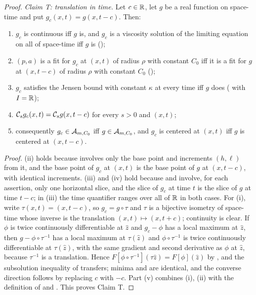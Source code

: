 \begin{proof}
\emph{Claim T: translation in time.}
Let $c\in\mathbb{R}$, let $g$ be a real function on space-time and put
$g_c(x,t)=g(x,t-c)$. Then:
\begin{enumerate}
\item[(i)] $g_c$ is continuous iff $g$ is, and $g_c$ is a viscosity solution of
the limiting equation on all of space-time iff $g$ is
();
\item[(ii)] $(p,a)$ is a fit for $g_c$ at $(x,t)$ of radius $\rho$ with constant
$C_0$ iff it is a fit for $g$ at $(x,t-c)$ of radius $\rho$ with constant $C_0$
();
\item[(iii)] $g_c$ satisfies the Jensen bound with constant $\kappa$ at every
time iff $g$ does ( with $I=\mathbb{R}$);
\item[(iv)] $\mathcal{C}_sg_c(x,t)=\mathcal{C}_sg(x,t-c)$ for every $s>0$ and $(x,t)$;
\item[(v)] consequently $g_c\in\mathcal{A}_{m,C_0}$ iff $g\in\mathcal{A}_{m,C_0}$, and
$g_c$ is centered at $(x,t)$ iff $g$ is centered at $(x,t-c)$.
\end{enumerate}
\emph{Proof.} (ii) holds because  involves only the base point
and increments $(h,\ell)$ from it, and the base point of $g_c$ at $(x,t)$ is the
base point of $g$ at $(x,t-c)$, with identical increments. (iii) and (iv) hold
because  and  involve, for each
assertion, only one horizontal slice, and the slice of $g_c$ at time $t$ is the
slice of $g$ at time $t-c$; in (iii) the time quantifier ranges over all of $\mathbb{R}$
in both cases. For (i), write $\tau(x,t)=(x,t-c)$, so $g_c=g\circ\tau$ and
$\tau$ is a bijective isometry of space-time whose inverse is the translation
$(x,t)\mapsto(x,t+c)$; continuity is clear. If $\phi$ is twice continuously
differentiable at $\hat z$ and $g_c-\phi$ has a local maximum at $\hat z$, then
$g-\phi\circ\tau^{-1}$ has a local maximum at $\tau(\hat z)$ and
$\phi\circ\tau^{-1}$ is twice continuously differentiable at $\tau(\hat z)$,
with the same gradient and second derivative as $\phi$ at $\hat z$, because
$\tau^{-1}$ is a translation. Hence $F[\phi\circ\tau^{-1}](\tau\hat z)
=F[\phi](\hat z)$ by , and the subsolution inequality of
 transfers; minima and  are
identical, and the converse direction follows by replacing $c$ with $-c$. Part
(v) combines (i), (ii) with the definition of  and
. This proves Claim T.


\end{proof}
